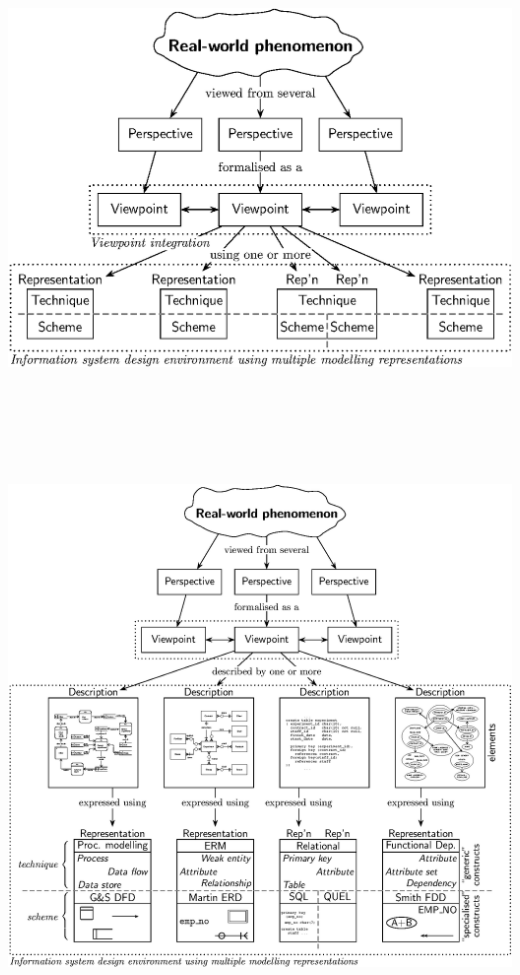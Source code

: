 \documentclass[oneside]{article}
\begin{document}
\pagestyle{empty}

\begin{center}
\mbox{}\vfill
\includegraphics[width=20cm,keepaspectratio,angle=90]{BaseFramework}
\vfill\mbox{}

\newpage

\mbox{}\vfill
\includegraphics[height=18cm,keepaspectratio,angle=90]{ExtendedFramework}
\vfill\mbox{}


\end{center}
\end{document}
